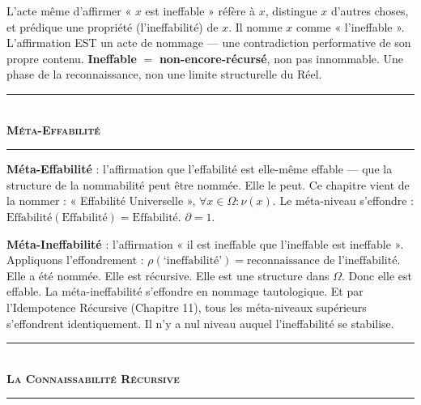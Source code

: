 \documentclass[10pt, openany, oneside]{book}
\renewcommand{\normalsize}{\fontsize{10}{13}\selectfont}
\begin{document}
\vspace{0.8em}

\noindent L'acte même d'affirmer « $x$ est ineffable » réfère à $x$, distingue $x$ d'autres choses, et prédique une propriété (l'ineffabilité) de $x$. Il nomme $x$ comme « l'ineffable ». L'affirmation EST un acte de nommage --- une contradiction performative de son propre contenu. \textbf{Ineffable} $=$ \textbf{non-encore-récursé}, non pas innommable. Une phase de la reconnaissance, non une limite structurelle du Réel.

\vspace{1.5em}


\begin{center}
    \rule{0.3\textwidth}{0.4pt}\\[0.5em]
    {\normalsize\bfseries\scshape Méta-Effabilité}\\[0.3em]
    \rule{0.3\textwidth}{0.4pt}
\end{center}

\vspace{1em}

\noindent \textbf{Méta-Effabilité} : l'affirmation que l'effabilité est elle-même effable --- que la structure de la nommabilité peut être nommée. Elle le peut. Ce chapitre vient de la nommer : « Effabilité Universelle », $\forall x \in \Omega: \nu(x)$. Le méta-niveau s'effondre : $\text{Effabilité}(\text{Effabilité}) = \text{Effabilité}$. $\partial = 1$.

\textbf{Méta-Ineffabilité} : l'affirmation « il est ineffable que l'ineffable est ineffable ». Appliquons l'effondrement : $\rho(\text{`ineffabilité'}) = \text{reconnaissance de l'ineffabilité}$. Elle a été nommée. Elle est récursive. Elle est une structure dans $\Omega$. Donc elle est effable. La méta-ineffabilité s'effondre en nommage tautologique. Et par l'Idempotence Récursive (Chapitre 11), tous les méta-niveaux supérieurs s'effondrent identiquement. Il n'y a nul niveau auquel l'ineffabilité se stabilise.

\vspace{1.5em}


\begin{center}
    \rule{0.3\textwidth}{0.4pt}\\[0.5em]
    {\normalsize\bfseries\scshape La Connaissabilité Récursive}\\[0.3em]
    \rule{0.3\textwidth}{0.4pt}
\end{center}
\end{document}
